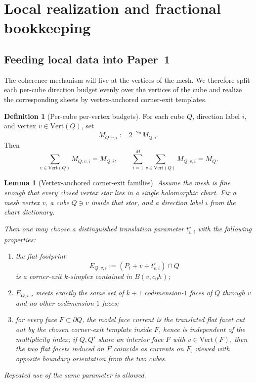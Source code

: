 \documentclass[11pt]{article}
\numberwithin{equation}{section}
\theoremstyle{plain}
\newtheorem{lemma}[theorem]{Lemma}
\theoremstyle{definition}
\newtheorem{definition}[theorem]{Definition}
\theoremstyle{remark}
\begin{document}
\section{Local realization and fractional bookkeeping}\label{sec:local}

\subsection{Feeding local data into Paper~1}

The coherence mechanism will live at the vertices of the mesh.  We therefore split each per-cube direction budget evenly over the vertices of the cube and realize the corresponding sheets by vertex-anchored corner-exit templates.

\begin{definition}[Per-cube per-vertex budgets]\label{def:vertex-budget}
For each cube $Q$, direction label $i$, and vertex $v\in\mathrm{Vert}(Q)$, set
\[
M_{Q,v,i}:=2^{-2n}M_{Q,i}.
\]
Then
\[
\sum_{v\in\mathrm{Vert}(Q)} M_{Q,v,i}=M_{Q,i},
\qquad
\sum_{i=1}^M\sum_{v\in\mathrm{Vert}(Q)} M_{Q,v,i}=M_Q.
\]
\end{definition}

\begin{lemma}[Vertex-anchored corner-exit families]\label{lem:vertex-template}
Assume the mesh is fine enough that every closed vertex star lies in a single holomorphic chart.  Fix a mesh vertex $v$, a cube $Q\ni v$ inside that star, and a direction label $i$ from the chart dictionary.

Then one may choose a distinguished translation parameter $t_{v,i}^\star$ with the following properties:
\begin{enumerate}
\item[\textnormal{(i)}] the flat footprint
\[
E_{Q,v,i}:=(P_i+v+t_{v,i}^\star)\cap Q
\]
is a corner-exit $k$-simplex contained in $B(v,c_0h)$;
\item[\textnormal{(ii)}] $E_{Q,v,i}$ meets exactly the same set of $k+1$ codimension-$1$ faces of $Q$ through $v$ and no other codimension-$1$ faces;
\item[\textnormal{(iii)}] for every face $F\subset\partial Q$, the model face current is the translated flat facet cut out by the chosen corner-exit template inside $F$, hence is independent of the multiplicity index; if $Q,Q'$ share an interior face $F$ with $v\in\mathrm{Vert}(F)$, then the two flat facets induced on $F$ coincide as currents on $F$, viewed with opposite boundary orientation from the two cubes.
\end{enumerate}
Repeated use of the same parameter is allowed.
\end{lemma}
\end{document}
